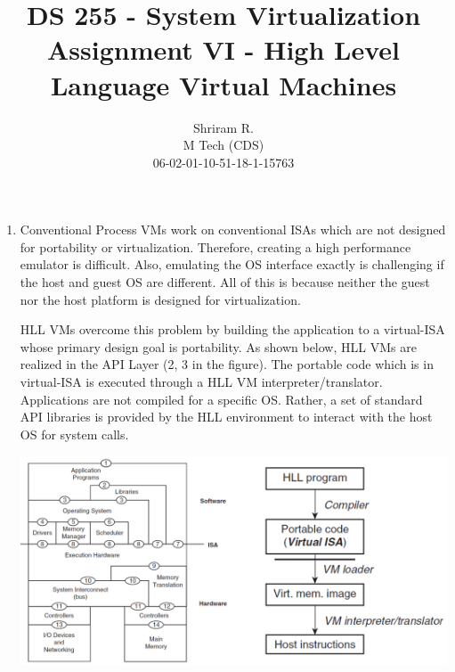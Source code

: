 \documentclass[11pt,a4paper,oneside]{article}
\begin{document}
	\title{DS 255 - System Virtualization \\ Assignment VI - High Level Language Virtual Machines}
	\author{Shriram R. \\ M Tech (CDS) \\ 06-02-01-10-51-18-1-15763}
	\maketitle	
	
	\begin{enumerate}
		\item Conventional Process VMs work on conventional ISAs which are not designed for portability or virtualization. Therefore, creating a high performance emulator is difficult. Also, emulating the OS interface exactly is challenging if the host and guest OS are different. All of this is because neither the guest nor the host platform is designed for virtualization.
		
		HLL VMs overcome this problem by building the application to a virtual-ISA whose primary design goal is portability. As shown below, HLL VMs are realized in the API Layer (2, 3 in the figure). The portable code which is in virtual-ISA is executed through a HLL VM interpreter/translator. Applications are not compiled for a specific OS. Rather, a set of standard API libraries is provided by the HLL environment to interact with the host OS for system calls.
		
		\begin{center}
			\includegraphics[scale=0.7]{4.png}
		\end{center}
		

\end{enumerate}
\end{document}
